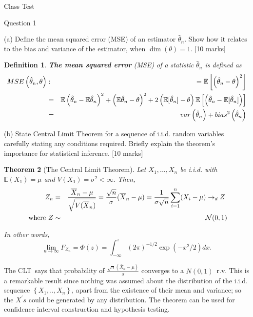 \documentclass{article}
\newtheorem{theorem}{Theorem}
\newtheorem{definition}[theorem]{Definition}
\begin{document}
\begin{center}
{\Large Class Test}
\end{center}

Question 1

(a) Define the mean squared error (MSE) of an estimator $\hat{\theta}_{n}$.
Show how it relates to the bias and variance of the estimator, when $\dim
\left( \theta \right) =1$. [10 marks]

\begin{definition}
\textbf{The mean squared error} (MSE) of a statistic $\hat{\theta}_{n}$ is
defined as 
\begin{eqnarray*}
MSE\left( \hat{\theta}_{n},\theta \right) &:&=\mathbb{E}\left[ \left( \hat{%
\theta}_{n}-\theta \right) ^{2}\right] \\
&=&\mathbb{E}\left( \hat{\theta}_{n}-\mathbb{E}\hat{\theta}_{n}\right)
^{2}+\left( \mathbb{E}\hat{\theta}_{n}-\theta \right) ^{2}+2\left( \mathbb{E}%
[\hat{\theta}_{n}]-\theta \right) \mathbb{E}\left[ \left( \hat{\theta}_{n}-%
\mathbb{E}[\hat{\theta}_{n}]\right) \right] \\
&=&var\left( \hat{\theta}_{n}\right) +bias^{2}\left( \hat{\theta}_{n}\right)
\end{eqnarray*}
\end{definition}

(b) State Central Limit Theorem for a sequence of i.i.d. random variables
carefully stating any conditions required. Briefly explain the theorem's
importance for statistical inference. [10 marks]

\begin{theorem}[The Central Limit Theorem]
Let $X_{1},...,X_{n}$ be i.i.d. with $\mathbb{E}\left( X_{1}\right) =\mu $
and $V\left( X_{1}\right) =\sigma ^{2}<\infty .$ Then, 
\begin{eqnarray*}
Z_{n} &=&\frac{\overline{X}_{n}-\mu }{\sqrt{V(\overline{X}_{n})}}=\frac{%
\sqrt{n}}{\sigma }(\overline{X}_{n}-\mu )=\frac{1}{\sigma \sqrt{n}}%
\sum_{i=1}^{n}(X_{i}-\mu )\rightarrow _{d}Z\text{ } \\
\text{\ where }Z &\sim &\mathcal{N}(0,1)
\end{eqnarray*}

In other words, 
\begin{equation*}
\lim_{n\rightarrow \infty }F_{Z_{n}}=\Phi (z)=\int_{-\infty }^{z}(2\pi
)^{-1/2}\exp (-x^{2}/2)dx.
\end{equation*}
\end{theorem}

The CLT\ says that probability of $\frac{\sqrt{n}\left( \bar{X}_{n}-\mu
\right) }{\sigma }$ converges to a $N\left( 0,1\right) $\ r.v. This is a
remarkable result since nothing was assumed about the distribution of the
i.i.d. sequence $\left\{ X_{1},..,X_{n}\right\} $, apart from the existence
of their mean and variance; so the $X^{\prime }s$ could be generated by any
distribution. The theorem can be used for confidence interval construction
and hypothesis testing.
\end{document}
